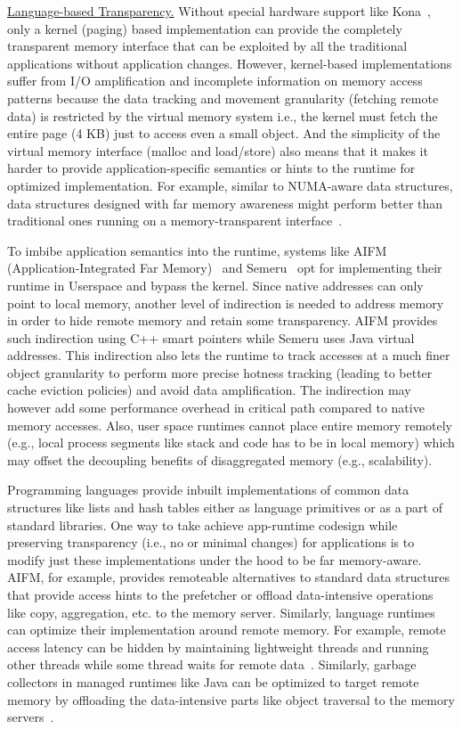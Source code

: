 \vspace{5pt}
\noindent \uline{Language-based Transparency.}
Without special hardware support like Kona~\cite{kona}, 
only a kernel (paging) based implementation can provide 
the completely transparent memory interface that can be 
exploited by all the traditional applications
without application changes. However, kernel-based 
implementations suffer from I/O amplification and 
incomplete information on memory access 
patterns because the data tracking and movement granularity 
(fetching remote data) is restricted by the virtual memory 
system i.e., the kernel must fetch the entire page (4 KB) 
just to access even a small object. And the simplicity  
of the virtual memory interface 
(malloc and load/store) also means that it makes it 
harder to provide application-specific semantics or 
hints to the runtime for optimized implementation. 
For example, similar to NUMA-aware data 
structures, data structures designed with far memory 
awareness might perform better than traditional ones 
running on a memory-transparent interface~\cite{Aguilera2019}. 

To imbibe application semantics into the runtime, systems 
like AIFM (Application-Integrated Far Memory)~\cite{aifm} 
and Semeru~\cite{semeru} opt for implementing their runtime in 
Userspace and bypass the kernel. Since native addresses can 
only point to local memory, another level of indirection 
is needed to address memory in order to hide remote memory
and retain some transparency. AIFM provides such indirection 
using C++ smart pointers while Semeru 
uses Java virtual addresses. This indirection also lets 
the runtime to track accesses at a much finer object 
granularity to perform more precise hotness tracking 
(leading to better cache eviction policies) and avoid 
data amplification. The indirection may however add some 
performance overhead in critical path compared to native 
memory accesses. Also, user space runtimes cannot place entire 
memory remotely
(e.g., local process segments like stack and code has to be in 
local memory) which may offset the decoupling benefits of 
disaggregated memory (e.g., scalability).

Programming languages provide inbuilt implementations of 
common data structures like lists and hash tables either as 
language primitives or as a part of standard libraries. 
One way to take achieve app-runtime codesign while preserving 
transparency (i.e., no or minimal changes) for applications 
is to modify just these implementations under the hood to be 
far memory-aware. AIFM, for example, provides remoteable 
alternatives to standard data structures that provide access 
hints to the prefetcher or offload data-intensive operations 
like copy, aggregation, etc. to the memory server. Similarly,
language runtimes can optimize their implementation around 
remote memory. For example, remote access latency can 
be hidden by maintaining lightweight threads and running other
threads while some thread waits for remote data~\cite{aifm}.  
Similarly, garbage collectors in managed runtimes like Java
can be optimized to target remote memory by offloading the 
data-intensive parts like object traversal to the memory 
servers~\cite{semeru}.


